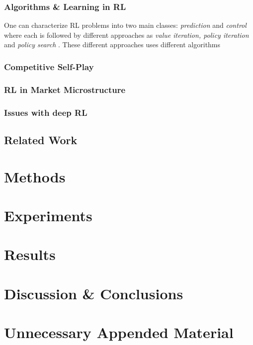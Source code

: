 \documentclass{kththesis}
\theoremstyle{definition}
\begin{document}
\subsection{Algorithms \& Learning in RL}
One can characterize RL problems into two main classes: \textit{prediction} and \textit{control} where each is followed by different approaches as \textit{value iteration, policy iteration} and \textit{policy search} \parencite{szepesvari2009algorithms}. These different approaches uses different algorithms 

\subsection{Competitive Self-Play}

\subsection{RL in Market Microstructure}

\subsection{Issues with deep RL}





\section{Related Work}


\chapter{Methods}

\chapter{Experiments}

\chapter{Results}

\chapter{Discussion \& Conclusions}

\printbibliography[heading=bibintoc] %

\appendix

\chapter{Unnecessary Appended Material}
\end{document}
